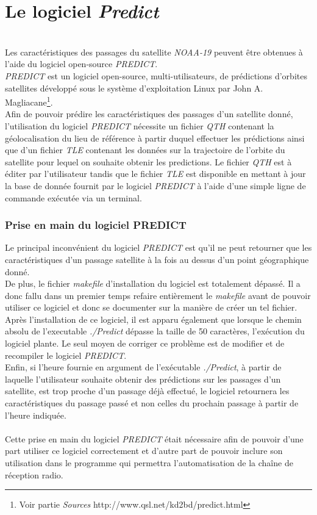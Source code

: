 \documentclass[12pt,fleqn]{book} %
\begin{document}
\section{Le logiciel \emph{Predict}}
~\\\indent Les caractéristiques des passages du satellite \emph{NOAA-19} peuvent être obtenues à l'aide du logiciel open-source \emph{PREDICT}. 
~\\\emph{PREDICT} est un logiciel open-source, multi-utilisateurs, de prédictions d'orbites satellites développé sous le système d'exploitation Linux par John A. Magliacane\footnote{Voir partie \emph{Sources} http://www.qsl.net/kd2bd/predict.html}.
~\\Afin de pouvoir prédire les caractéristiques des passages d'un satellite donné, l'utilisation du logiciel \emph{PREDICT} nécessite un fichier \emph{QTH} contenant la géolocalisation du lieu de référence à partir duquel effectuer les prédictions ainsi que d'un fichier \emph{TLE} contenant les données sur la trajectoire de l'orbite du satellite pour lequel on souhaite obtenir les predictions. Le fichier \emph{QTH} est à éditer par l'utilisateur tandis que le fichier \emph{TLE} est disponible en mettant à jour la base de donnée fournit par le logiciel \emph{PREDICT} à l'aide d'une simple ligne de commande exécutée via un terminal.
\subsubsection{Prise en main du logiciel PREDICT}
\noindent Le principal inconvénient du logiciel \emph{PREDICT} est qu'il ne peut retourner que les caractéristiques d'un passage satellite à la fois au dessus d'un point géographique donné.  
~\\De plus, le fichier \emph{makefile} d'installation du logiciel est totalement dépassé. Il a donc fallu dans un premier temps refaire entièrement le \emph{makefile} avant de pouvoir utiliser ce logiciel et donc se documenter sur la manière de créer un tel fichier. 
~\\Après l'installation de ce logiciel, il est apparu également que lorsque le chemin absolu de l'executable \emph{./Predict} dépasse la taille de 50 caractères, l'exécution du logiciel plante. Le seul moyen de corriger ce problème est de modifier et de recompiler le logiciel \emph{PREDICT}.
~\\Enfin, si l'heure fournie en argument de l'exécutable \emph{./Predict}, à partir de laquelle l'utilisateur souhaite obtenir des prédictions sur les passages d'un satellite, est trop proche d'un passage déjà effectué, le logiciel retournera les caractéristiques du passage passé et non celles du prochain passage à partir de l'heure indiquée.
~\\\\Cette prise en main du logiciel \emph{PREDICT} était nécessaire afin de pouvoir d'une part utiliser ce logiciel correctement et d'autre part de pouvoir inclure son utilisation dans le programme qui permettra l'automatisation de la chaîne de réception radio.
\end{document}
